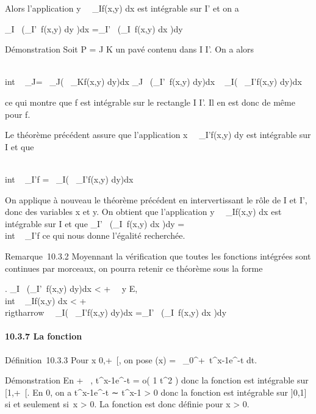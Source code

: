 \documentclass[]{article}
\begin{document}
Alors l'application
y\mapsto~\int ~
_If(x,y) dx est intégrable sur I' et on a

\int  _I~\left
(\int  _I'~f(x,y) dy\right
)dx =\int  _I'~\left
(\int  _I~f(x,y) dx\right
)dy

Démonstration Soit P = J \times K un pavé contenu dans I \times I'. On a alors

\int  \\int ~
_J\timesKf =\int ~
_J\left (\int ~
_Kf(x,y) dy\right )dx
\leq\int  _J~\left
(\int  _I'~f(x,y)
dy\right )dx \leq\int ~
_I\left (\int ~
_I'f(x,y) dy\right )dx

ce qui montre que f est intégrable sur le rectangle
I \times I'. Il en est donc de même pour f.

Le théorème précédent assure que l'application
x\mapsto~\int ~
_I'f(x,y) dy est intégrable sur I et que

\int  \\int ~
_I\timesI'f =\int ~
_I\left (\int ~
_I'f(x,y) dy\right )dx

On applique à nouveau le théorème précédent en intervertissant le rôle
de I et I', donc des variables x et y. On obtient que l'application
y\mapsto~\int ~
_If(x,y) dx est intégrable sur I et que
\int  _I'~\left
(\int  _I~f(x,y) dx\right
)dy =\int  \\int ~
_I\timesI'f ce qui nous donne l'égalité recherchée.

Remarque~10.3.2 Moyennant la vérification que toutes les fonctions
intégrées sont continues par morceaux, on pourra retenir ce théorème
sous la forme

\left .\array
\int  _I~\left
(\int  _I'~f(x,y)
dy\right )dx \textless{} +\infty~ \cr
\forall~y \in E, \\int ~
_If(x,y) dx \textless{} +\infty~ 
\right \\rigtharrow~\int ~
_I\left (\int ~
_I'f(x,y) dy\right )dx
=\int  _I'~\left
(\int  _I~f(x,y) dx\right
)dy

\paragraph{10.3.7 La fonction \Gamma}

Définition~10.3.3 Pour x \in{]}0,+\infty~{[}, on pose \Gamma(x)
=\int ~
_0^+\infty~t^x-1e^-t dt.

Démonstration En + \infty~, t^x-1e^-t = o( 1
\over t^2 ) donc la fonction est intégrable
sur {[}1,+\infty~{[}. En 0, on a t^x-1e^-t ∼
t^x-1 \textgreater{} 0 donc la fonction est intégrable sur
{]}0,1{]} si et seulement si~x \textgreater{} 0. La fonction \Gamma est donc
définie pour x \textgreater{} 0.
\end{document}
